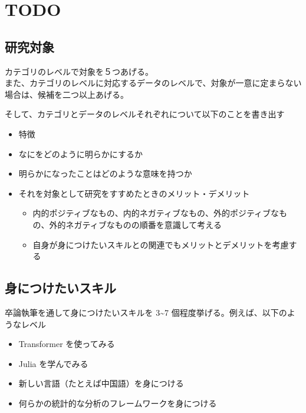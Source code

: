 \hypertarget{todo}{%
\section{TODO}\label{todo}}

\hypertarget{ux7814ux7a76ux5bfeux8c61}{%
\subsection{研究対象}\label{ux7814ux7a76ux5bfeux8c61}}

カテゴリのレベルで対象を５つあげる。\\
また、カテゴリのレベルに対応するデータのレベルで、対象が一意に定まらない場合は、候補を二つ以上あげる。

そして、カテゴリとデータのレベルそれぞれについて以下のことを書き出す

\begin{itemize}
\tightlist
\item
  特徴
\item
  なにをどのように明らかにするか
\item
  明らかになったことはどのような意味を持つか
\item
  それを対象として研究をすすめたときのメリット・デメリット

  \begin{itemize}
  \tightlist
  \item
    内的ポジティブなもの、内的ネガティブなもの、外的ポジティブなもの、外的ネガティブなものの順番を意識して考える
  \item
    自身が身につけたいスキルとの関連でもメリットとデメリットを考慮する
  \end{itemize}
\end{itemize}

\hypertarget{ux8eabux306bux3064ux3051ux305fux3044ux30b9ux30adux30eb}{%
\subsection{身につけたいスキル}\label{ux8eabux306bux3064ux3051ux305fux3044ux30b9ux30adux30eb}}

卒論執筆を通して身につけたいスキルを 3\textasciitilde7
個程度挙げる。例えば、以下のようなレベル

\begin{itemize}
\tightlist
\item
  Transformer を使ってみる
\item
  Julia を学んでみる
\item
  新しい言語（たとえば中国語）を身につける
\item
  何らかの統計的な分析のフレームワークを身につける
\end{itemize}

